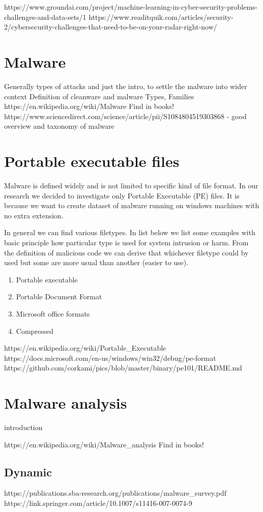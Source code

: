 https://www.groundai.com/project/machine-learning-in-cyber-security-problems-challenges-and-data-sets/1
https://www.readitquik.com/articles/security-2/cybersecurity-challenges-that-need-to-be-on-your-radar-right-now/


\section{Malware}
Generally types of attacks and just the intro, to settle the malware into wider context
Definition of cleanware and malware
Types, Families
https://en.wikipedia.org/wiki/Malware
Find in books!
https://www.sciencedirect.com/science/article/pii/S1084804519303868 - good overview and taxonomy of malware

\section{Portable executable files}
Malware is defined widely and is not limited to specific kind of file format. In our research we decided to investigate only Portable Executable (PE) files. It is because we want to create dataset of malware running on windows machines with no extra extension. 

In general we can find various filetypes. In list below we list some examples with basic principle how particular type is used for system intrusion or harm. From the definition of malicious code we can derive that whichever filetype could by used but some are more usual than another (easier to use).
\begin{enumerate}
  \item Portable executable
  \item Portable Document Format
  \item Microsoft office formats
  \item Compressed
\end{enumerate}

https://en.wikipedia.org/wiki/Portable_Executable
https://docs.microsoft.com/en-us/windows/win32/debug/pe-format
https://github.com/corkami/pics/blob/master/binary/pe101/README.md

\section{Malware analysis}
introduction

https://en.wikipedia.org/wiki/Malware_analysis
Find in books!

\subsection{Dynamic}
https://publications.sba-research.org/publications/malware_survey.pdf
https://link.springer.com/article/10.1007/s11416-007-0074-9

